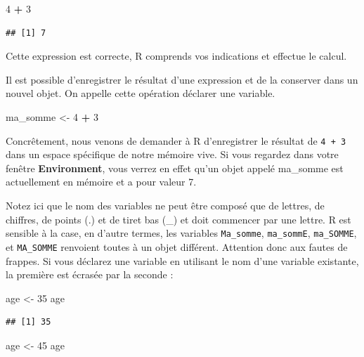 \documentclass[
  11pt,
  french,
]{book}
\makeatletter
\newenvironment{Shaded}{\begin{snugshade}}{\end{snugshade}}
\newcommand{\DecValTok}[1]{\textcolor[rgb]{0.00,0.00,0.81}{#1}}
\newcommand{\NormalTok}[1]{#1}
\newcommand{\OperatorTok}[1]{\textcolor[rgb]{0.81,0.36,0.00}{\textbf{#1}}}
\newcommand{\StringTok}[1]{\textcolor[rgb]{0.31,0.60,0.02}{#1}}
\newenvironment{kframe}{%
\medskip{}
\setlength{\fboxsep}{.8em}
 \def\at@end@of@kframe{}%
 \ifinner\ifhmode%
  \def\at@end@of@kframe{\end{minipage}}%
  \begin{minipage}{\columnwidth}%
 \fi\fi%
 \def\FrameCommand##1{\hskip\@totalleftmargin \hskip-\fboxsep
 \colorbox{shadecolor}{##1}\hskip-\fboxsep
     \hskip-\linewidth \hskip-\@totalleftmargin \hskip\columnwidth}%
 \MakeFramed {\advance\hsize-\width
   \@totalleftmargin\z@ \linewidth\hsize
   \@setminipage}}%
 {\par\unskip\endMakeFramed%
 \at@end@of@kframe}
\renewenvironment{Shaded}{\begin{kframe}}{\end{kframe}}
\makeatother
\begin{document}
\begin{Shaded}
\begin{Highlighting}[]
\DecValTok{4} \OperatorTok{+}\StringTok{ }\DecValTok{3}
\end{Highlighting}
\end{Shaded}

\begin{verbatim}
## [1] 7
\end{verbatim}

Cette expression est correcte, R comprends vos indications et effectue le calcul.

Il est possible d'enregistrer le résultat d'une expression et de la conserver dans un nouvel objet. On appelle cette opération déclarer une variable.

\begin{Shaded}
\begin{Highlighting}[]
\NormalTok{ma_somme <-}\StringTok{ }\DecValTok{4} \OperatorTok{+}\StringTok{ }\DecValTok{3}
\end{Highlighting}
\end{Shaded}

Concrêtement, nous venons de demander à R d'enregistrer le résultat de \texttt{4\ +\ 3} dans un espace spécifique de notre mémoire vive. Si vous regardez dans votre fenêtre \textbf{Environment}, vous verrez en effet qu'un objet appelé ma\_somme est actuellement en mémoire et a pour valeur 7.

Notez ici que le nom des variables ne peut être composé que de lettres, de chiffres, de points (.) et de tiret bas (\_) et doit commencer par une lettre. R est sensible à la case, en d'autre termes, les variables \texttt{Ma\_somme}, \texttt{ma\_sommE}, \texttt{ma\_SOMME}, et \texttt{MA\_SOMME} renvoient toutes à un objet différent. Attention donc aux fautes de frappes. Si vous déclarez une variable en utilisant le nom d'une variable existante, la première est écrasée par la seconde :

\begin{Shaded}
\begin{Highlighting}[]
\NormalTok{age <-}\StringTok{ }\DecValTok{35}
\NormalTok{age}
\end{Highlighting}
\end{Shaded}

\begin{verbatim}
## [1] 35
\end{verbatim}

\begin{Shaded}
\begin{Highlighting}[]
\NormalTok{age <-}\StringTok{ }\DecValTok{45}
\NormalTok{age}
\end{Highlighting}
\end{Shaded}
\end{document}

